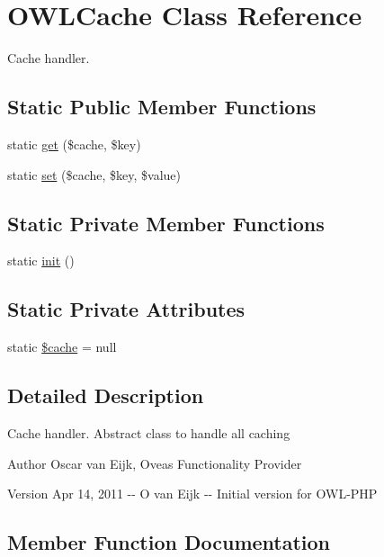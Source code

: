 \section{OWLCache Class Reference}
\label{classOWLCache}


Cache handler.  


\subsection*{Static Public Member Functions}
\begin{DoxyCompactItemize}
\item 
static \hyperlink{classOWLCache_a5c9e800ea5a9e0b0829b31466e94b539}{get} (\$cache, \$key)
\item 
static \hyperlink{classOWLCache_aa4f5e152fc2b1f5f88d2128a68322cc8}{set} (\$cache, \$key, \$value)
\end{DoxyCompactItemize}
\subsection*{Static Private Member Functions}
\begin{DoxyCompactItemize}
\item 
static \hyperlink{classOWLCache_a8acd763ed96208dbd8e5b46adf4d28cd}{init} ()
\end{DoxyCompactItemize}
\subsection*{Static Private Attributes}
\begin{DoxyCompactItemize}
\item 
static \hyperlink{classOWLCache_a429167796c668f4edde177d017f9f86c}{\$cache} = null
\end{DoxyCompactItemize}


\subsection{Detailed Description}
Cache handler. Abstract class to handle all caching \begin{DoxyAuthor}{Author}
Oscar van Eijk, Oveas Functionality Provider 
\end{DoxyAuthor}
\begin{DoxyVersion}{Version}
Apr 14, 2011 -\/-\/ O van Eijk -\/-\/ Initial version for OWL-\/PHP 
\end{DoxyVersion}


\subsection{Member Function Documentation}
